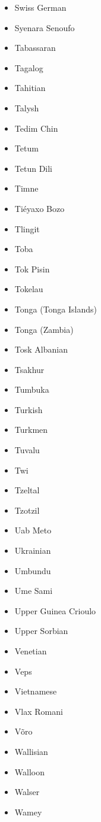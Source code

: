 \documentclass[paper=a4, 10pt]{scrbook}
\begin{document}
\begin{multicols}{3}
\begin{itemize}
        \item Swiss German
        \item Syenara Senoufo
        \item Tabassaran
        \item Tagalog
        \item Tahitian
        \item Talysh
        \item Tedim Chin
        \item Tetum
        \item Tetun Dili
        \item Timne
        \item Tiéyaxo Bozo
        \item Tlingit
        \item Toba
        \item Tok Pisin
        \item Tokelau
        \item Tonga (Tonga Islands)
        \item Tonga (Zambia)
        \item Tosk Albanian
        \item Tsakhur
        \item Tumbuka
        \item Turkish
        \item Turkmen
        \item Tuvalu
        \item Twi
        \item Tzeltal
        \item Tzotzil
        \item Uab Meto
        \item Ukrainian
        \item Umbundu
        \item Ume Sami
        \item Upper Guinea Crioulo
        \item Upper Sorbian
        \item Venetian
        \item Veps
        \item Vietnamese
        \item Vlax Romani
        \item Võro
        \item Wallisian
        \item Walloon
        \item Walser
        \item Wamey

\end{itemize}
\end{multicols}
\end{document}
